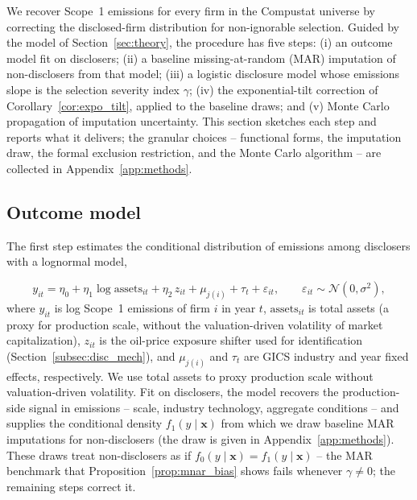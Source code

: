 \documentclass[a4paper,12pt]{article}
\begin{document}
We recover Scope~1 emissions for every firm in the Compustat universe by correcting the disclosed-firm distribution for non-ignorable selection. Guided by the model of Section~\ref{sec:theory}, the procedure has five steps: (i) an outcome model fit on disclosers; (ii) a baseline missing-at-random (MAR) imputation of non-disclosers from that model; (iii) a logistic disclosure model whose emissions slope is the selection severity index $\gamma$; (iv) the exponential-tilt correction of Corollary~\ref{cor:expo_tilt}, applied to the baseline draws; and (v) Monte Carlo propagation of imputation uncertainty. This section sketches each step and reports what it delivers; the granular choices -- functional forms, the imputation draw, the formal exclusion restriction, and the Monte Carlo algorithm -- are collected in Appendix~\ref{app:methods}. 



\subsection{Outcome model}
\label{subsec:outcome}

The first step estimates the conditional distribution of emissions among disclosers with a lognormal model,

\begin{equation}
\label{eq:outcome_model}
y_{it} = \eta_0 + \eta_1 \log \mathrm{assets}_{it} + \eta_2\, z_{it} + \mu_{j(i)} + \tau_t + \varepsilon_{it}, \qquad \varepsilon_{it} \sim \mathcal{N}(0, \sigma^2),
\end{equation}
where $y_{it}$ is log Scope~1 emissions of firm $i$ in year $t$, $\mathrm{assets}_{it}$ is total assets (a proxy for production scale, without the valuation-driven volatility of market capitalization), $z_{it}$ is the oil-price exposure shifter used for identification (Section~\ref{subsec:disc_mech}), and $\mu_{j(i)}$ and $\tau_t$ are GICS industry and year fixed effects, respectively. We use total assets to proxy production scale without valuation-driven volatility. Fit on disclosers, the model recovers the production-side signal in emissions -- scale, industry technology, aggregate conditions -- and supplies the conditional density $f_1(y\mid\mathbf{x})$ from which we draw baseline MAR imputations for non-disclosers (the draw is given in Appendix~\ref{app:methods}). These draws treat non-disclosers as if $f_0(y\mid\mathbf{x}) = f_1(y\mid\mathbf{x})$ -- the MAR benchmark that Proposition~\ref{prop:mnar_bias} shows fails whenever $\gamma \neq 0$; the remaining steps correct it.
\end{document}
